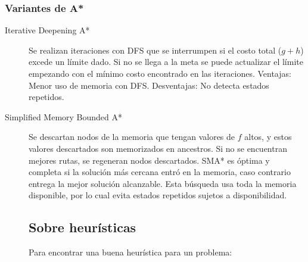 \subsubsection{Variantes de A*}
\begin{description}
    \item[Iterative Deepening A*] Se realizan iteraciones con DFS que se
    interrumpen si el costo total ($g + h$) excede un límite dado. Si no
    se llega a la meta se puede actualizar el límite empezando con el mínimo
    costo encontrado en las iteraciones. Ventajas: Menor uso de memoria con
    DFS. Desventajas: No detecta estados repetidos.
    \item[Simplified Memory Bounded A*] Se descartan nodos de la memoria que
    tengan valores de $f$ altos, y estos valores descartados son memorizados
    en ancestros. Si no se encuentran mejores rutas, se regeneran nodos
    descartados. SMA* es óptima y completa si la solución más cercana entró
    en la memoria, caso contrario entrega la mejor solución alcanzable. Esta
    búsqueda usa toda la memoria disponible, por lo cual evita estados
    repetidos sujetos a disponibilidad.  

\subsection{Sobre heurísticas}
Para encontrar una buena heurística para un problema:
\end{description}
